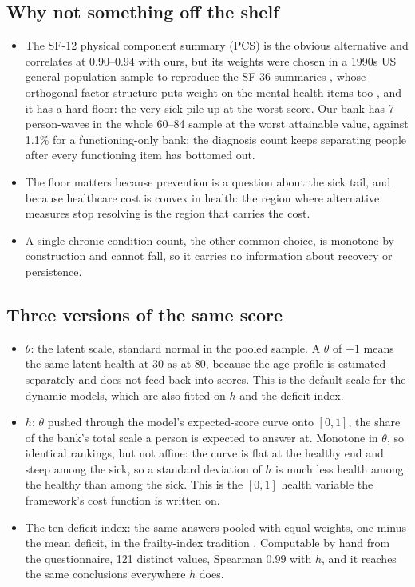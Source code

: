 \documentclass[11pt]{article}
\begin{document}
\subsection{Why not something off the shelf}
\begin{itemize}
\item The SF-12 physical component summary (PCS) is the obvious alternative and correlates at $0.90$--$0.94$ with ours, but its weights were chosen in a 1990s US general-population sample to reproduce the SF-36 summaries \citep{ware1996}, whose orthogonal factor structure puts weight on the mental-health items too \citep{farivar2007}, and it has a hard floor: the very sick pile up at the worst score. Our bank has 7 person-waves in the whole 60--84 sample at the worst attainable value, against 1.1\% for a functioning-only bank; the diagnosis count keeps separating people after every functioning item has bottomed out.
\item The floor matters because prevention is a question about the sick tail, and because healthcare cost is convex in health: the region where alternative measures stop resolving is the region that carries the cost.
\item A single chronic-condition count, the other common choice, is monotone by construction and cannot fall, so it carries no information about recovery or persistence.
\end{itemize}

\subsection{Three versions of the same score}
\begin{itemize}
\item $\theta$: the latent scale, standard normal in the pooled sample. A $\theta$ of $-1$ means the same latent health at 30 as at 80, because the age profile is estimated separately and does not feed back into scores. This is the default scale for the dynamic models, which are also fitted on $h$ and the deficit index.
\item $h$: $\theta$ pushed through the model's expected-score curve onto $[0,1]$, the share of the bank's total scale a person is expected to answer at. Monotone in $\theta$, so identical rankings, but not affine: the curve is flat at the healthy end and steep among the sick, so a standard deviation of $h$ is much less health among the healthy than among the sick. This is the $[0,1]$ health variable the framework's cost function is written on.
\item The ten-deficit index: the same answers pooled with equal weights, one minus the mean deficit, in the frailty-index tradition \citep{mitnitski2001,searle2008}. Computable by hand from the questionnaire, 121 distinct values, Spearman $0.99$ with $h$, and it reaches the same conclusions everywhere $h$ does.
\end{itemize}
\end{document}
